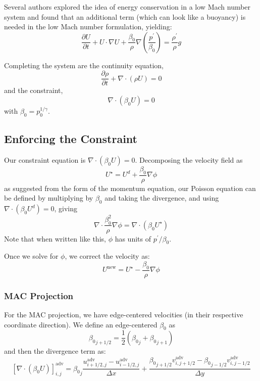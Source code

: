Several authors \cite{KP:2012,VLBWZ:2013} explored the idea of energy
conservation in a low Mach number system and found that an additional term (which can
look like a buoyancy) is needed in the low Mach number formulation, yielding:
\begin{equation}
\frac{\partial U}{\partial t} + U \cdot \nabla U + 
   \frac{\beta_0}{\rho} \nabla \left (\frac{p^\prime}{\beta_0} \right ) = 
   \frac{\rho^\prime}{\rho} g
\end{equation}

Completing the system are the continuity equation,
\begin{equation}
\frac{\partial \rho}{\partial t} + \nabla \cdot (\rho U) = 0
\end{equation}
and the constraint,
\begin{equation}
\nabla \cdot (\beta_0 U) = 0
\end{equation}
with $\beta_0 = p_0^{1/\gamma}$.

\subsection{Enforcing the Constraint}

Our constraint equation is $\nabla \cdot (\beta_0 U) = 0$.
Decomposing the velocity field as
\begin{equation}
U^\star = U^d + \frac{\beta_0}{\rho} \nabla \phi
\end{equation}
as suggested from the form of the momentum equation,
our Poisson equation can be defined by multiplying by $\beta_0$ and
taking the divergence, and using $\nabla \cdot (\beta_0 U^d) = 0$, giving
\begin{equation}
\nabla \cdot \frac{\beta_0^2}{\rho} \nabla \phi = \nabla \cdot (\beta_0 U^\star)
\end{equation}
Note that when written like this, $\phi$ has units of $p^\prime/\beta_0$. 

Once we solve for $\phi$, we correct the velocity as:
\begin{equation}
U^\mathrm{new} = U^\star - \frac{\beta_0}{\rho} \nabla \phi
\end{equation}


\subsubsection{MAC Projection}

For the MAC projection, we have edge-centered velocities (in their
respective coordinate direction).  We define an edge-centered $\beta_0$ as
\begin{equation}
{\beta_0}_{j+1/2} = \frac{1}{2} ( {\beta_0}_j + {\beta_0}_{j+1} )
\end{equation}
and then the divergence term as:
\begin{equation}
\left [ \nabla \cdot (\beta_0 U) \right ]_{i,j}^\mathrm{adv} =
   {\beta_0}_j \frac{u^\mathrm{adv}_{i+1/2,j} - 
                     u^\mathrm{adv}_{i-1/2,j}}{\Delta x} +
   \frac{{\beta_0}_{j+1/2} v^\mathrm{adv}_{i,j+1/2} - 
         {\beta_0}_{j-1/2} v^\mathrm{adv}_{i,j-1/2} }{\Delta y}
\end{equation}

